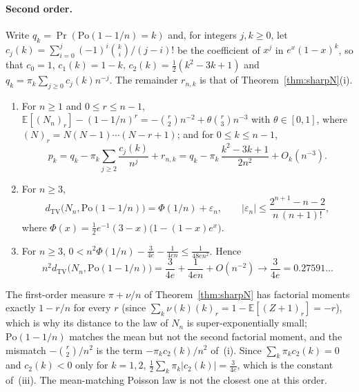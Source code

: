 \paragraph{Second order.}
Write $q_k=\Pr(\mathrm{Po}(1-1/n)=k)$ and, for integers $j,k\ge0$, let $c_j(k)=\sum_{i=0}^{j}(-1)^i\binom ki/(j-i)!$ be the coefficient of $x^j$ in $e^x(1-x)^k$, so that $c_0=1$, $c_1(k)=1-k$, $c_2(k)=\tfrac12(k^2-3k+1)$ and $q_k=\pi_k\sum_{j\ge0}c_j(k)n^{-j}$. The remainder $r_{n,k}$ is that of Theorem~\ref{thm:sharpN}(i).

\begin{theorem}\label{thm:secondN}
\begin{enumerate}[label=(\roman*),leftmargin=2em]
\item For $n\ge1$ and $0\le r\le n-1$, $\mathbb E[(N_n)_r]-(1-1/n)^r=-\binom r2n^{-2}+\theta\binom r3n^{-3}$ with $\theta\in[0,1]$, where $(N)_r=N(N-1)\cdots(N-r+1)$; and for $0\le k\le n-1$,
\[
p_k=q_k-\pi_k\sum_{j\ge2}\frac{c_j(k)}{n^{j}}+r_{n,k}=q_k-\pi_k\,\frac{k^2-3k+1}{2n^2}+O_k(n^{-3}).
\]
\item For $n\ge3$,
\[
d_{\mathrm{TV}}\bigl(N_n,\mathrm{Po}(1-1/n)\bigr)=\Phi(1/n)+\varepsilon_n,\qquad
|\varepsilon_n|\le\frac{2^{n+1}-n-2}{n\,(n+1)!},
\]
where $\Phi(x)=\tfrac12e^{-1}(3-x)\bigl(1-(1-x)e^{x}\bigr)$.
\item For $n\ge3$, $0<n^2\Phi(1/n)-\frac3{4e}-\frac1{4en}\le\frac1{48en^2}$. Hence
\[
n^2d_{\mathrm{TV}}\bigl(N_n,\mathrm{Po}(1-1/n)\bigr)=\frac3{4e}+\frac1{4en}+O(n^{-2})\longrightarrow\frac3{4e}=0.27591\ldots
\]
\end{enumerate}
\end{theorem}

\noindent The first-order measure $\pi+\nu/n$ of Theorem~\ref{thm:sharpN} has factorial moments exactly $1-r/n$ for every $r$ (since $\sum_k\nu(k)(k)_r=1-\mathbb E[(Z+1)_r]=-r$), which is why its distance to the law of $N_n$ is super-exponentially small; $\mathrm{Po}(1-1/n)$ matches the mean but not the second factorial moment, and the mismatch $-\binom r2/n^2$ is the term $-\pi_kc_2(k)/n^2$ of~(i). Since $\sum_k\pi_kc_2(k)=0$ and $c_2(k)<0$ only for $k=1,2$, $\tfrac12\sum_k\pi_k|c_2(k)|=\tfrac3{4e}$, which is the constant of~(iii). The mean-matching Poisson law is not the closest one at this order.


